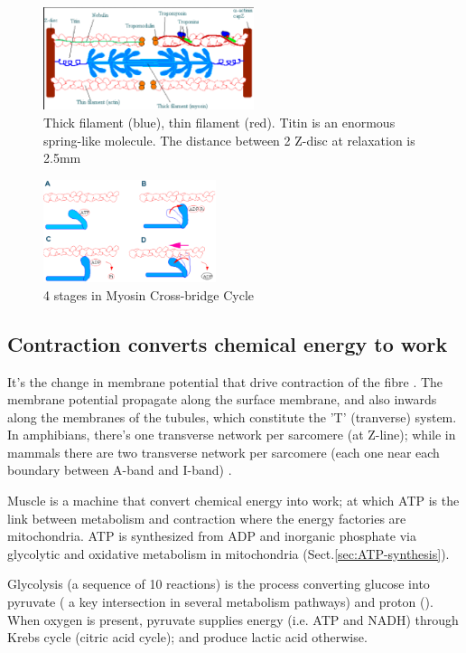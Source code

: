 \begin{figure}[hbt]
  \centerline{\includegraphics[height=3cm,
    angle=0]{./images/sarcomere.eps}}
\caption{Thick filament (blue), thin filament (red). Titin is an enormous
spring-like molecule. The distance between 2 Z-disc at relaxation is 2.5mm}
\label{fig:sarcomere}
\end{figure}

\begin{figure}[hbt]
  \centerline{\includegraphics[height=3cm,
    angle=0]{./images/myosin_cross-bridge.eps}}
\caption{4 stages in Myosin Cross-bridge Cycle}
\label{fig:myosin_cross-bridge}
\end{figure}




\subsection{Contraction converts chemical energy to work}


It's the change in membrane potential that drive contraction of the fibre
\citep{kuffler1946}. The membrane potential propagate along the surface membrane, and also inwards along
the membranes of the tubules, which constitute the 'T' (tranverse) system. In
amphibians, there's one transverse network per sarcomere (at Z-line); while in
mammals there are two transverse network per sarcomere (each one near each
boundary between A-band and I-band) \citep{page1969}.

Muscle is a machine that convert chemical energy into work; at which ATP is the
link between metabolism and contraction where the energy factories are mitochondria.
ATP is synthesized from ADP and inorganic phosphate via glycolytic and oxidative
metabolism in mitochondria (Sect.\ref{sec:ATP-synthesis}).

Glycolysis (a sequence of 10 reactions) is the process converting glucose into
pyruvate ( a key intersection in several metabolism pathways) and
proton (). When oxygen is present, pyruvate supplies energy (i.e. ATP and
NADH) through Krebs cycle (citric acid cycle); and produce lactic acid
otherwise.

